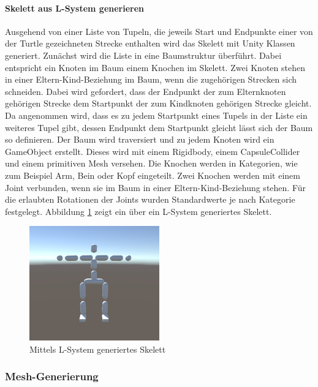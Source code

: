 \paragraph*{Skelett aus L-System generieren}\label{sec:lsystemskel}
Ausgehend von einer Liste von Tupeln, die jeweils Start und Endpunkte einer von der Turtle gezeichneten Strecke enthalten wird das Skelett mit Unity Klassen generiert. Zunächst wird die Liste in eine Baumstruktur überführt. Dabei entspricht ein Knoten im Baum einem Knochen im Skelett. Zwei Knoten stehen in einer Eltern-Kind-Beziehung im Baum, wenn die zugehörigen Strecken sich schneiden. Dabei wird gefordert, dass der Endpunkt der zum Elternknoten gehörigen Strecke dem Startpunkt der zum Kindknoten gehörigen Strecke gleicht. Da angenommen wird, dass es zu jedem Startpunkt eines Tupels in der Liste ein weiteres Tupel gibt, dessen Endpunkt dem Startpunkt gleicht lässt sich der Baum so definieren. Der Baum wird traversiert und zu jedem Knoten wird ein GameObject erstellt.  Dieses wird mit einem Rigidbody, einem CapsuleCollider und einem primitiven Mesh versehen. Die Knochen werden in Kategorien, wie zum Beispiel Arm, Bein oder Kopf eingeteilt. Zwei Knochen werden mit einem Joint verbunden, wenn sie im Baum in einer Eltern-Kind-Beziehung stehen. Für die erlaubten Rotationen der Joints wurden Standardwerte je nach Kategorie festgelegt. Abbildung \ref{skeletonlsystemex} zeigt ein über ein L-System generiertes Skelett.

\begin{figure}[h]
	\begin{center}
		\includegraphics[width = 0.5\textwidth]{resources/img/skeletonlsystemex.png}
	\end{center}
	\caption{Mittels L-System generiertes Skelett}
	\label{skeletonlsystemex}
\end{figure}


\subsubsection{Mesh-Generierung}
